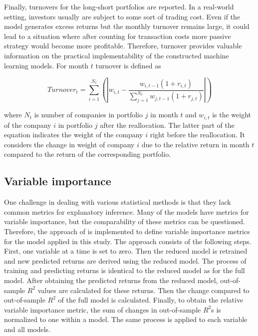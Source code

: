 \documentclass[12pt]{article}
\begin{document}
Finally, turnovers for the long-short portfolios are reported. In a real-world setting, investors usually are subject to some sort of trading cost. Even if the model generates excess returns but the monthly turnover remains large, it could lead to a situation where after counting for transaction costs more passive strategy would become more profitable. Therefore, turnover provides valuable information on the practical implementability of the constructed machine learning models. For month $t$ turnover is defined as \par

\begin{equation}
\label{eq:Turnover}
Turnover_t = \sum_{i=1}^{N_t}  \left ( \left | w_{i, t} - \frac{w_{i, t-1}(1 + r_{i, t})}{ \sum_{j=1}^{N_{t}} w_{j, t-1}(1 + r_{j, t})} \right | \right )
\end{equation}

where $N_t$ is number of companies in portfolio $j$ in month $t$ and $w_{i, t}$ is the weight of the company $i$ in portfolio $j$ after the reallocation. The latter part of the equation indicates the weight of the company $i$ right before the reallocation. It considers the change in weight of company $i$ due to the relative return in month $t$ compared to the return of the corresponding portfolio.

\subsection{Variable importance} \label{VariableImportance}

One challenge in dealing with various statistical methods is that they lack common metrics for explanatory inference. Many of the models have metrics for variable importance, but the comparability of these metrics can be questioned. Therefore, the approach of \citet{guetal} is implemented to define variable importance metrics for the model applied in this study. The approach consists of the following steps. First, one variable at a time is set to zero. Then the reduced model is retrained and new predicted returns are derived using the reduced model. The process of training and predicting returns is identical to the reduced model as for the full model. After obtaining the predicted returns from the reduced model, out-of-sample $R^2$ values are calculated for these returns. Then the change compared to out-of-sample $R^2$ of the full model is calculated. Finally, to obtain the relative variable importance metric, the sum of changes in out-of-sample $R^2$s is normalized to one within a model. The same process is applied to each variable and all models.\footnotemark {} \par
\end{document}
